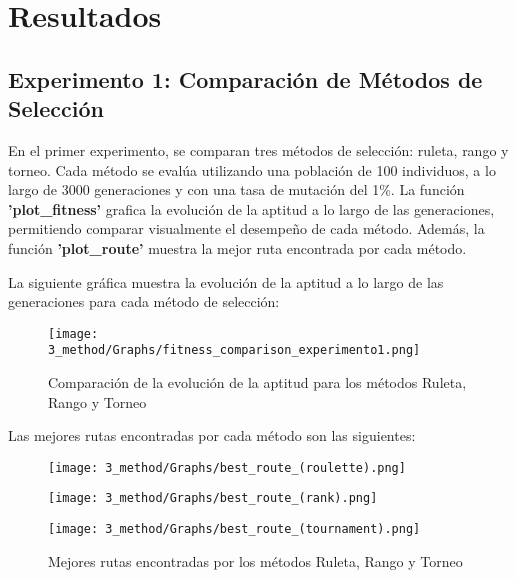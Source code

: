 


\section{Resultados}


\subsection{Experimento 1: Comparación de Métodos de Selección}
En el primer experimento, se comparan tres métodos de selección: ruleta, rango y torneo. Cada método se evalúa utilizando una población de 100 individuos, a lo largo de 3000 generaciones y con una tasa de mutación del 1\%. La función \textbf{'plot\_fitness'} grafica la evolución de la aptitud a lo largo de las generaciones, permitiendo comparar visualmente el desempeño de cada método. Además, la función \textbf{'plot\_route'} muestra la mejor ruta encontrada por cada método.

La siguiente gráfica muestra la evolución de la aptitud a lo largo de las generaciones para cada método de selección:

\begin{figure}[H]
  \centering
  \caption{Comparación de la evolución de la aptitud para los métodos Ruleta, Rango y Torneo}
  \texttt{[image: 3\_method/Graphs/fitness\_comparison\_experimento1.png]}
\end{figure}

Las mejores rutas encontradas por cada método son las siguientes:

\begin{figure}[H]
  \centering
  \caption{Mejores rutas encontradas por los métodos Ruleta, Rango y Torneo}
  \begin{minipage}{0.32\textwidth}
    \centering
    \texttt{[image: 3\_method/Graphs/best\_route\_(roulette).png]}
  \end{minipage}\hfill
  \begin{minipage}{0.32\textwidth}
    \centering
    \texttt{[image: 3\_method/Graphs/best\_route\_(rank).png]}
  \end{minipage}\hfill
  \begin{minipage}{0.32\textwidth}
    \centering
    \texttt{[image: 3\_method/Graphs/best\_route\_(tournament).png]}
  \end{minipage}
\end{figure}


